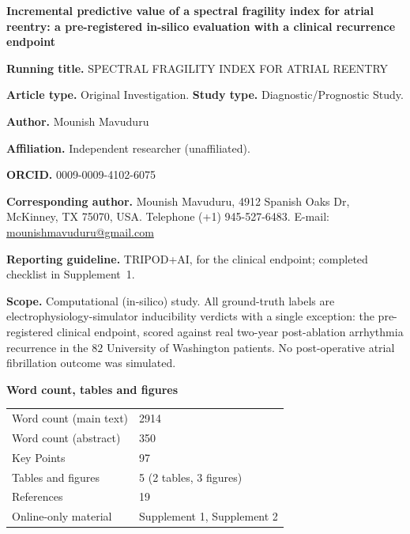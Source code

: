 \documentclass[11pt]{article}
\begin{document}
\thispagestyle{empty}

\begin{center}
{\Large\bfseries Incremental predictive value of a spectral fragility index for
atrial reentry: a pre-registered in-silico evaluation with a clinical
recurrence endpoint\par}
\end{center}

\vspace{0.7em}
\noindent\textbf{Running title.} SPECTRAL FRAGILITY INDEX FOR ATRIAL REENTRY

\smallskip
\noindent\textbf{Article type.} Original Investigation. \textbf{Study type.}
Diagnostic/Prognostic Study.

\smallskip
\noindent\textbf{Author.} Mounish Mavuduru

\smallskip
\noindent\textbf{Affiliation.} Independent researcher (unaffiliated).

\smallskip
\noindent\textbf{ORCID.} 0009-0009-4102-6075

\smallskip
\noindent\textbf{Corresponding author.} Mounish Mavuduru, 4912 Spanish Oaks Dr,
McKinney, TX 75070, USA. Telephone (+1) 945-527-6483. E-mail:
\href{mailto:mounishmavuduru@gmail.com}{mounishmavuduru@gmail.com}

\vspace{0.7em}
\noindent\textbf{Reporting guideline.} TRIPOD+AI, for the clinical endpoint;
completed checklist in Supplement~1.

\smallskip
\noindent\textbf{Scope.} Computational (in-silico) study. All ground-truth labels
are electrophysiology-simulator inducibility verdicts with a single exception:
the pre-registered clinical endpoint, scored against real two-year
post-ablation arrhythmia recurrence in the $82$ University of Washington
patients. No post-operative atrial fibrillation outcome was simulated.

\vspace{0.7em}
\noindent\textbf{Word count, tables and figures}

\smallskip
\begin{tabular}{@{}ll@{}}
\toprule
Word count (main text)  & 2914 \\
Word count (abstract)   & 350 \\
Key Points              & 97 \\
Tables and figures      & 5 (2 tables, 3 figures) \\
References              & 19 \\
Online-only material    & Supplement 1, Supplement 2 \\
\bottomrule
\end{tabular}
\end{document}
